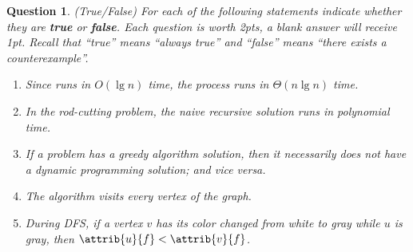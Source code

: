 \documentclass[11pt]{amsart}
\theoremstyle{theorem}
\newtheorem{question}{Question}
\begin{document}
\begin{question}
(True/False) For each of the following statements indicate whether they are \textbf{true} or \textbf{false}. Each question is worth 2pts, a blank answer will receive 1pt. Recall that ``true'' means ``always true'' and ``false'' means ``there exists a counterexample''.
\begin{enumerate}
\item Since  runs in $O(\lg n)$ time, the process  runs in $\Theta(n\lg n)$ time.
\item In the rod-cutting problem, the naive recursive solution  runs in polynomial time.
\item If a problem has a greedy algorithm solution, then it necessarily does not have a dynamic programming solution; and vice versa.
\item The algorithm  visits every vertex of the graph.
\item During DFS, if a vertex $v$ has its color changed from white to gray while $u$ is gray, then $\attrib{u}{f}<\attrib{v}{f}$.
\end{enumerate}
\end{question}
\end{document}
